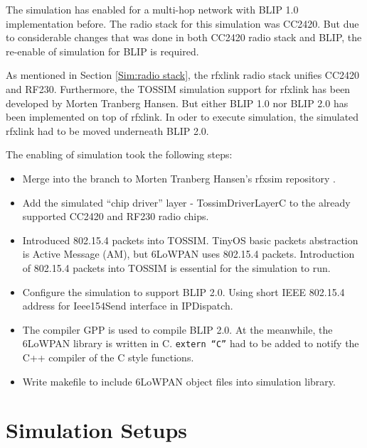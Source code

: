 The simulation has enabled for a multi-hop network with BLIP 1.0 implementation before. The radio stack for this simulation was CC2420. But due to considerable changes that was done in both CC2420 radio stack and BLIP, the re-enable of simulation for BLIP is required. 
\newline

As mentioned in Section \ref{Sim:radio stack}, the rfxlink radio stack unifies CC2420 and RF230. Furthermore, the TOSSIM simulation support for rfxlink has been developed by Morten Tranberg Hansen. But either BLIP 1.0 nor BLIP 2.0 has been implemented on top of rfxlink. In oder to execute simulation, the simulated rfxlink had to be moved underneath BLIP 2.0. 
\newline

The enabling of simulation took the following steps: 
\begin{itemize}
\item Merge into the branch to Morten Tranberg Hansen's rfxsim repository \cite{rfxsim}. 
\newline

\item Add the simulated ``chip driver'' layer - TossimDriverLayerC to the already supported CC2420 and RF230 radio chips. 
\newline

\item Introduced 802.15.4 packets into TOSSIM. TinyOS basic packets abstraction is Active Message (AM), but 6LoWPAN uses 802.15.4 packets. Introduction of 802.15.4 packets into TOSSIM is essential for the simulation to run.
\newline

\item Configure the simulation to support BLIP 2.0. Using short IEEE 802.15.4 address for Ieee154Send interface in IPDispatch. 
\newline

\item The compiler GPP is used to compile BLIP 2.0. At the meanwhile, the 6LoWPAN library is written in C. \texttt{extern ``C''} had to be added to notify the C++ compiler of the C style functions.
\newline

\item Write makefile to include 6LoWPAN object files into simulation library.
\end{itemize}

\section{Simulation Setups}
\label{Sim:Setup}
